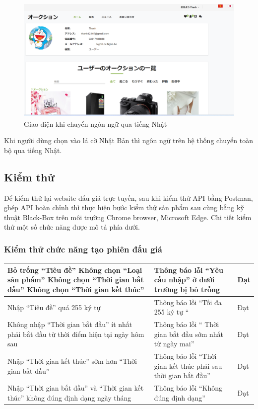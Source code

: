 \documentclass{article}
\begin{document}
\begin{figure}[H]
    \centering
    \includegraphics[width=11.4cm,height=6.06cm]{images/jp.png}
    \caption{Giao diện khi chuyển ngôn ngữ qua tiếng Nhật}
    \label{hinh421}
\end{figure}
Khi người dùng chọn vào lá cờ Nhật Bản thì ngôn ngữ trên hệ thống chuyển toàn bộ qua tiếng Nhật.
\subsection{Kiểm thử}
Để kiểm thử lại website đấu giá trực tuyến, sau khi kiểm thử API bằng Postman, ghép API hoàn chỉnh thì thực hiện bước kiểm thử sản phẩm sau cùng bằng kỹ thuật Black-Box trên môi trường Chrome browser, Microsoft Edge. Chi tiết kiểm thử một số chức năng được mô tả phía dưới. 
\subsubsection{Kiểm thử chức năng tạo phiên đấu giá}
\newpage
    \tabletail{\hline}
    \label{bang413}
    \begin{supertabular}{| p{.45\textwidth}|p{.30\textwidth}|p{.15\textwidth}|} 
    \hline
        Bỏ trống “Tiêu đề”
        Không chọn “Loại sản phẩm”
        Không chọn “Thời gian bắt đầu”
        Không chọn  “Thời gian kết thúc”
        & Thông báo lỗi “Yêu cầu nhập” ở dưới trường bị bỏ trống&Đạt \\\hline
        Nhập “Tiêu đề” quá 255 ký tự
        & Thông báo lỗi “Tối đa 255 ký tự “&Đạt \\\hline
        Không nhập “Thời gian bắt đầu”  ít nhất phải bắt đầu từ thời điểm hiện tại ngày hôm sau
        & Thông báo lỗi “ Thời gian bắt đầu sớm nhất từ ngày mai”&Đạt \\\hline
        Nhập “Thời gian kết thúc” sớm hơn “Thời gian bắt đầu”
        & Thông báo lỗi “Thời gian kết thúc phải sau thời gian bắt đầu”&Đạt \\\hline
        Nhập “Thời gian bắt đầu” và “Thời gian kết thúc” không đúng định dạng ngày tháng
        & Thông báo lỗi “Không đúng định dạng”&Đạt \\\hline
    \end{supertabular}
\end{document}
